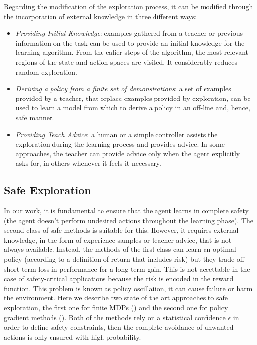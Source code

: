 Regarding the modification of the exploration process, it can be modified through the incorporation of external knowledge in three different ways:
\begin{itemize}
	\item \emph{Providing Initial Knowledge}: examples gathered from a teacher or previous information on the task can be used to provide an initial knowledge for the learning algorithm. From the ealier steps of the algorithm, the most relevant regions of the state and action spaces are visited. It considerably reduces random exploration.
	\item \emph{Deriving a policy from a finite set of demonstrations}: a set of examples provided by a teacher, that replace examples provided by exploration, can be used to learn a model from which to derive a policy in an off-line and, hence, safe manner.
	\item \emph{Providing Teach Advice}: a human or a simple controller assists the exploration during the learning process and provides advice. In some approaches, the teacher can provide advice only when the agent explicitly asks for, in others whenever it feels it necessary. 
\end{itemize}

\subsection{Safe Exploration}
In our work, it is fundamental to ensure that the agent learns in complete safety (\ie the agent doesn't perform undesired actions throughout the learning phase). The second class of safe methods is suitable for this. However, it requires external knowledge, in the form of experience samples or teacher advice, that is not always available. Instead, the methods of the first class can learn an optimal policy (according to a definition of return that includes risk) but they trade-off short term loss in performance for a long term gain. This is not accettable in the case of safety-critical applications because the risk is encoded in the reward function. This problem is known as policy oscillation, it can cause failure or harm the environment. Here we describe two state of the art approaches to safe exploration, the first one for finite \ac{MDPs} () and the second one for policy gradient methods (). Both of the methods rely on a statistical confidence $\epsilon$ in order to define safety constraints, then the complete avoidance of unwanted actions is only ensured with high probability. 

